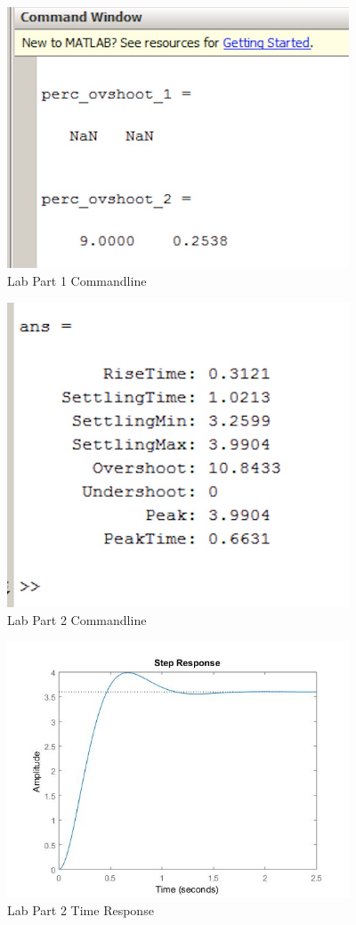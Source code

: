 \documentclass[12pt]{article}
\begin{document}
\begin{figure}[h!] %
   \centering
   \includegraphics[width=4in]{part_1_commandline.jpg} 
   \caption{Lab Part 1 Commandline}
   \label{fig:example}
\end{figure}

\begin{figure}[h!] %
   \centering
   \includegraphics[width=4in]{part_2_commandline.jpg} 
   \caption{Lab Part 2 Commandline}
   \label{fig:example}
\end{figure}

\begin{figure}[h!] %
   \centering
   \includegraphics[width=4in]{part_2_time_response.jpg} 
   \caption{Lab Part 2 Time Response}
   \label{fig:example}
\end{figure}
\end{document}
